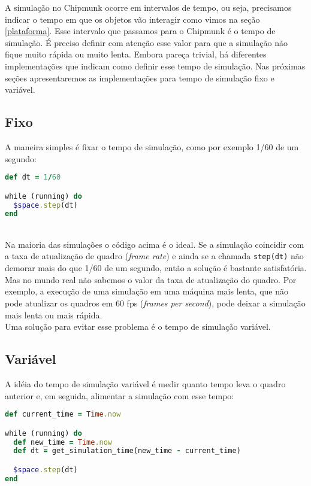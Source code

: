 A simulação no Chipmunk ocorre em intervalos de tempo, ou seja, precisamos indicar o tempo em que os objetos vão interagir como vimos na seção \ref{plataforma}. 
Esse intervalo que passamos para o Chipmunk é o tempo de simulação. É preciso definir com atenção esse valor para que a simulação não fique muito rápida
ou muito lenta. Embora pareça trivial, há diferentes implementações que indicam como definir esse tempo de simulação. Nas 
próximas seções apresentaremos as implementações para tempo de simulação fixo e variável.

\subsection{Fixo}

A maneira simples é fixar o tempo de simulação, como por exemplo 1/60 de um segundo:

\begin{lstlisting}[language=Ruby, caption=Implementação de tempo de simulação fixo]
def dt = 1/60

while (running) do
  $space.step(dt)
end
\end{lstlisting}

\ \\
\hspace*{14pt} Na maioria das simulações o código acima é o ideal. Se a simulação coincidir com a taxa de atualização de quadro (\textit{frame rate}) e ainda se a chamada {\tt step(dt)} não demorar mais do que 1/60 de um segundo, então a solução é bastante satisfatória. Mas no mundo real não sabemos
o valor da taxa de atualização do quadro. Por exemplo, a execução de uma simulação em uma máquina mais lenta, que não pode atualizar os quadros em 60 fps (\textit{frames per second}),
pode deixar a simulação mais lenta ou mais rápida. \\

Uma solução para evitar esse problema é o tempo de simulação variável.

\subsection{Variável}

A idéia do tempo de simulação variável é medir quanto tempo leva o quadro anterior e, em seguida, alimentar a simulação com esse tempo: 

\newpage
\begin{lstlisting}[language=Ruby, caption=Implementação de tempo de simulação variável]
def current_time = Time.now

while (running) do
  def new_time = Time.now
  def dt = get_simulation_time(new_time - current_time)

  $space.step(dt)
end

\end{lstlisting}

